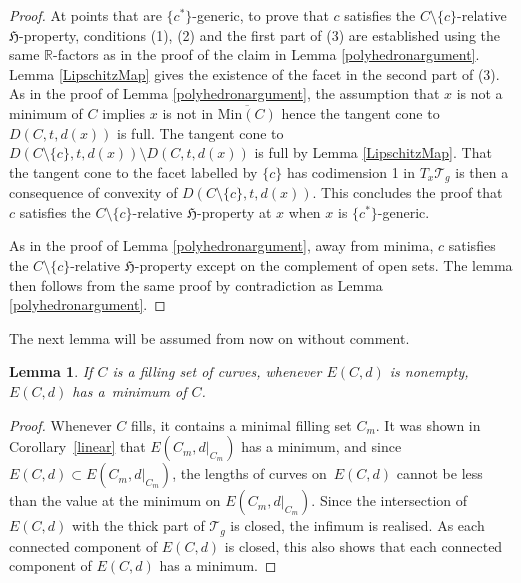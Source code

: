 \documentclass[11pt]{article}
\numberwithin{equation}{section}
\numberwithin{equation}{section}
\newtheorem{Lemma}[Theorem]{Lemma}
\begin{document}
\begin{proof}
At points that are $\{c^{*}\}$-generic, to prove that $c$ satisfies the $C\setminus \{c\}$-relative $\mathfrak{H}$-property, conditions (1), (2) and the first part of (3) are established using the same $\mathbb{R}$-factors as in the proof of the claim in Lemma \ref{polyhedronargument}. Lemma \ref{LipschitzMap} gives the existence of the facet in the second part of (3). As in the proof of Lemma \ref{polyhedronargument}, the assumption that $x$ is not a minimum of $C$ implies $x$ is not in $\overline{\mathrm{Min}(C)}$ hence the tangent cone to $D(C,t,d(x))$ is full. The tangent cone to~${D(C\setminus \{c\},t,d(x))\setminus D(C,t,d(x))}$ is full by Lemma \ref{LipschitzMap}. That the tangent cone to the facet labelled by $\{c\}$ has codimension 1 in $T_{x}\mathcal{T}_{g}$ is then a consequence of convexity of $D(C\setminus \{c\},t,d(x))$. This concludes the proof that $c$ satisfies the $C\setminus \{c\}$-relative $\mathfrak{H}$-property at $x$ when $x$ is $\{c^{*}\}$-generic.

As in the proof of Lemma \ref{polyhedronargument}, away from minima, $c$ satisfies the $C\setminus \{c\}$-relative $\mathfrak{H}$-property except on the complement of open sets. The lemma then follows from the same proof by contradiction as Lemma \ref{polyhedronargument}.
\end{proof}

The next lemma will be assumed from now on without comment.

\begin{Lemma}
\label{connectedminima}
If $C$ is a filling set of curves, whenever $E(C,d)$ is nonempty, $E(C,d)$ has a~minimum of $C$.
\end{Lemma}
\begin{proof}
Whenever $C$ fills, it contains a minimal filling set $C_{m}$. It was shown in Corollary~\ref{linear} that $E(C_{m}, d|_{C_{m}})$ has a minimum, and since $E(C,d)\subset E(C_{m}, d|_{C_{m}})$, the lengths of curves on~$E(C,d)$ cannot be less than the value at the minimum on $E(C_{m}, d|_{C_{m}})$. Since the intersection of $E(C,d)$ with the thick part of $\mathcal{T}_{g}$ is closed, the infimum is realised. As each connected component of $E(C,d)$ is closed, this also shows that each connected component of $E(C,d)$ has a minimum.
\end{proof}
\end{document}
